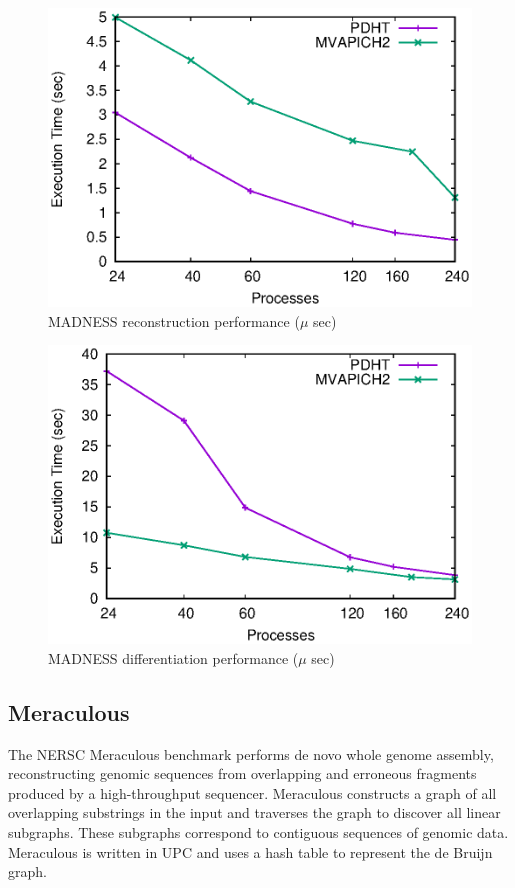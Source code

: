 \begin{figure}[ht]
  \center
  \includegraphics[width=.9\linewidth]{plots/reconstruct}
  \caption{MADNESS reconstruction performance ($\mu$ sec)}
  \label{fig:mad-reconstruct}
\end{figure}


\begin{figure}[ht]
  \center
  \includegraphics[width=.9\linewidth]{plots/diff}
  \caption{MADNESS differentiation performance ($\mu$ sec)}
  \label{fig:mad-diff}
\end{figure}

\subsection{Meraculous}

The NERSC Meraculous benchmark performs de novo whole genome assembly,
reconstructing genomic sequences from overlapping and erroneous fragments
produced by a high-throughput sequencer. Meraculous constructs a graph of all
overlapping substrings in the input and traverses the graph to discover all
linear subgraphs. These subgraphs correspond to contiguous sequences of
genomic data. Meraculous is written in UPC and uses a hash table
to represent the de Bruijn graph. 

